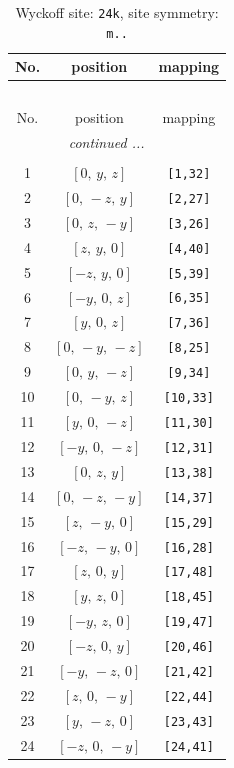 \documentclass[fleqn,8pt]{jsarticle}
\begin{document}
\begin{longtable}{ccc}
\caption{Wyckoff site: {\tt 24k}, site symmetry: {\tt m..}}
 \\
 \hline \hline
No. & position & mapping \\ \hline \endfirsthead

\multicolumn{2}{l}{\tablename\ \thetable{}} \\
 \hline \hline
No. & position & mapping \\ \hline \endhead

 \hline \hline
\multicolumn{2}{r}{\footnotesize\it continued ...} \\ \endfoot

 \hline \hline
\multicolumn{2}{r}{} \\ \endlastfoot

1 & $\left[ 0,\, y,\, z \right]$ & {\tt [1,32]} \\ \hline
2 & $\left[ 0,\, - z,\, y \right]$ & {\tt [2,27]} \\ \hline
3 & $\left[ 0,\, z,\, - y \right]$ & {\tt [3,26]} \\ \hline
4 & $\left[ z,\, y,\, 0 \right]$ & {\tt [4,40]} \\ \hline
5 & $\left[ - z,\, y,\, 0 \right]$ & {\tt [5,39]} \\ \hline
6 & $\left[ - y,\, 0,\, z \right]$ & {\tt [6,35]} \\ \hline
7 & $\left[ y,\, 0,\, z \right]$ & {\tt [7,36]} \\ \hline
8 & $\left[ 0,\, - y,\, - z \right]$ & {\tt [8,25]} \\ \hline
9 & $\left[ 0,\, y,\, - z \right]$ & {\tt [9,34]} \\ \hline
10 & $\left[ 0,\, - y,\, z \right]$ & {\tt [10,33]} \\ \hline
11 & $\left[ y,\, 0,\, - z \right]$ & {\tt [11,30]} \\ \hline
12 & $\left[ - y,\, 0,\, - z \right]$ & {\tt [12,31]} \\ \hline
13 & $\left[ 0,\, z,\, y \right]$ & {\tt [13,38]} \\ \hline
14 & $\left[ 0,\, - z,\, - y \right]$ & {\tt [14,37]} \\ \hline
15 & $\left[ z,\, - y,\, 0 \right]$ & {\tt [15,29]} \\ \hline
16 & $\left[ - z,\, - y,\, 0 \right]$ & {\tt [16,28]} \\ \hline
17 & $\left[ z,\, 0,\, y \right]$ & {\tt [17,48]} \\ \hline
18 & $\left[ y,\, z,\, 0 \right]$ & {\tt [18,45]} \\ \hline
19 & $\left[ - y,\, z,\, 0 \right]$ & {\tt [19,47]} \\ \hline
20 & $\left[ - z,\, 0,\, y \right]$ & {\tt [20,46]} \\ \hline
21 & $\left[ - y,\, - z,\, 0 \right]$ & {\tt [21,42]} \\ \hline
22 & $\left[ z,\, 0,\, - y \right]$ & {\tt [22,44]} \\ \hline
23 & $\left[ y,\, - z,\, 0 \right]$ & {\tt [23,43]} \\ \hline
24 & $\left[ - z,\, 0,\, - y \right]$ & {\tt [24,41]} \\
\end{longtable}
\end{document}
